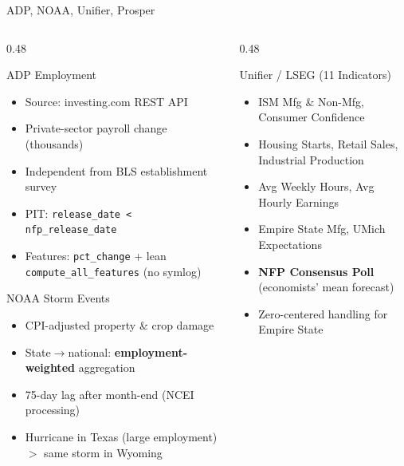 \documentclass[aspectratio=169,10pt]{beamer}
\begin{document}
\begin{frame}{ADP, NOAA, Unifier, Prosper}
\begin{columns}[T]
\begin{column}{0.48\textwidth}
\begin{block}{ADP Employment}
\footnotesize
\begin{itemize}
  \item Source: investing.com REST API
  \item Private-sector payroll change (thousands)
  \item Independent from BLS establishment survey
  \item PIT: \texttt{release\_date < nfp\_release\_date}
  \item Features: \texttt{pct\_change} + lean \texttt{compute\_all\_features} (no symlog)
\end{itemize}
\end{block}
\vspace{0.15cm}
\begin{block}{NOAA Storm Events}
\footnotesize
\begin{itemize}
  \item CPI-adjusted property \& crop damage
  \item State$\to$national: \textbf{employment-weighted} aggregation
  \item 75-day lag after month-end (NCEI processing)
  \item Hurricane in Texas (large employment) $>$ same storm in Wyoming
\end{itemize}
\end{block}
\end{column}
\begin{column}{0.48\textwidth}
\begin{block}{Unifier / LSEG (11 Indicators)}
\footnotesize
\begin{itemize}
  \item ISM Mfg \& Non-Mfg, Consumer Confidence
  \item Housing Starts, Retail Sales, Industrial Production
  \item Avg Weekly Hours, Avg Hourly Earnings
  \item Empire State Mfg, UMich Expectations
  \item \textbf{NFP Consensus Poll} (economists' mean forecast)
  \item Zero-centered handling for Empire State
\end{itemize}
\end{block}

\end{column}
\end{columns}
\end{frame}
\end{document}
